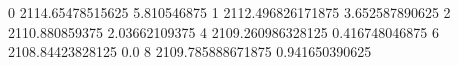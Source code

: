 0 2114.65478515625 5.810546875
1 2112.496826171875 3.652587890625
2 2110.880859375 2.03662109375
4 2109.260986328125 0.416748046875
6 2108.84423828125 0.0
8 2109.785888671875 0.941650390625
